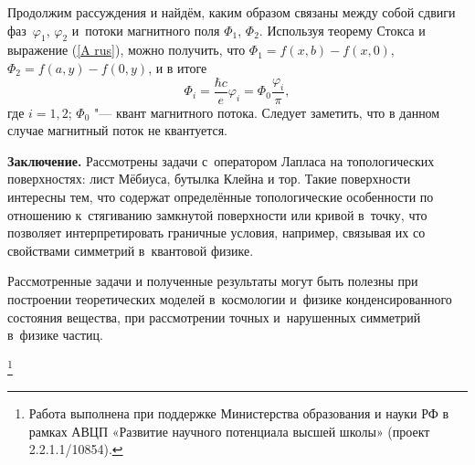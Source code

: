 Продолжим рассуждения и найдём, каким образом связаны между собой сдвиги фаз~$\varphi_1$, $\varphi_2$ и~потоки магнитного поля $\Phi_1$, $\Phi_2$.
Используя теорему Стокса и выражение (\ref{A rus}), можно получить, что 
$
\Phi_1=f(x,b)-f(x,0)$, $\Phi_2=f(a,y)-f(0,y)$, и 
в итоге %
$$
\Phi_i=\frac{\hbar c}{e}\varphi_i=\Phi_0\frac{\varphi_i}{\pi},
$$
где $i=1, 2$; $\Phi_0$ "--- квант магнитного потока.
Следует заметить, что в данном случае магнитный поток не квантуется.

\smallskip
\textbf{Заключение.} 
Рассмотрены задачи с~оператором Лапласа на топологических поверхностях: лист Мёбиуса, бутылка Клейна и тор. 
Такие поверхности интересны тем, что содержат определённые топологические особенности по отношению к~стягиванию замкнутой поверхности или кривой в~точку, что позволяет интерпретировать граничные условия, например, связывая их со свойствами симметрий в~квантовой физике.

Рассмотренные задачи и полученные результаты могут быть полезны при построении теоретических моделей в~космологии и~физике конденсированного состояния вещества, при рассмотрении точных и~нарушенных симметрий в~физике частиц.

\thanks{Работа выполнена при поддержке Министерства образования и науки РФ в рамках
АВЦП «Развитие научного потенциала высшей школы» (проект 2.2.1.1/10854).}

